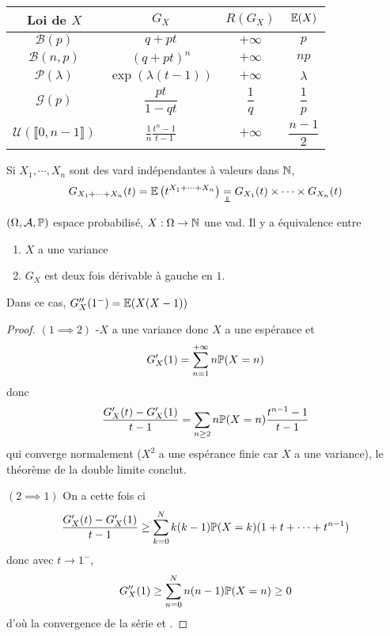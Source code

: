 \begin{ex}~
    \begin{center}
        \begin{tabular}{cccc}
            \hline \hline Loi de $X$ & $G_X$ & $R(G_X)$ & $ \E(X)$ \\
            \hline
            \rule{0pt}{2em} $\mathcal  B(p)$ &  $q+pt$ &  $+\infty$ &  $p$ \\
            \rule{0pt}{2em} $\mathcal B(n,p)$ &  $(q+pt)^n$ &  $+\infty$ & $np$ \\
            \rule{0pt}{2em} $\mathcal  P(\lambda)$ & $\exp (\lambda(t-1))$ & $+\infty$ & $\lambda$ \\
            \rule{0pt}{2em} $\mathcal  G(p)$ & $\dfrac{pt}{1-qt}$ &  $\dfrac{1}{q}$ & $\dfrac{1}{p}$ \\
            \rule{0pt}{2em} $\mathcal U(\llbracket 0,n-1 \rrbracket )$ & $\displaystyle \frac{1}{n} \frac{t^n-1}{t-1}$ & $+\infty$ &  $\dfrac{n-1}2$ \\[1em]
            \hline
        \end{tabular}
    \end{center}
\end{ex}

\begin{rem}
Si $ X_1,\cdots ,X_n$ sont des vard indépendantes à valeurs dans $ \N$, \[
    G_{X_1+\cdots +X_n}(t)=\E\left(t^{X_1+\cdots +X_n}\right)\underset\indep=G_{X_1}(t)\times \cdots \times G_{X_n}(t)
\] 
\end{rem}

\begin{thm}
    \Hyp $(\Omega,\mathcal A,\P)$ espace probabilisé, $X:\Omega\to \N$ une vad.
    \Conc Il y a équivalence entre \begin{enumerate}
        \item $X$ a une variance
        \item  $G_X$ est deux fois dérivable à gauche en  $1$.
    \end{enumerate}
    Dans ce cas, $G_X''(1^-)=\E(X(X-1))$
\end{thm}

\begin{proof}
    $(1\implies 2)$ \hyp $X$ a une variance donc  $X$ a une espérance et  \[
        G'_X(1)= \sum_{n=1}^{+\infty} n\P(X=n)
    \] 
    donc \[
        \frac{G_X'(t)-G_X'(1)}{t-1}=\sum_{n\geq 2}n\P(X=n) \frac{t^{n-1}-1}{t-1}
    \] 
    qui converge normalement ($X^2$ a une espérance finie  car $X$ a une variance), le théorème de la double limite conclut.

    $(2\implies 1)$ On a cette fois ci \[
        \frac{G_X'(t)-G_X'(1)}{t-1}\geq \sum_{k=0}^{N} k(k-1)\P(X=k)(1+t+\cdots +t^{n-1})
    \]
    donc avec $t\to 1^-$, \[
        G''_X(1)\geq  \sum_{n=0}^{N} n(n-1)\P(X=n)\geq 0
    \] 
    d'où la convergence de la série et \conc.
\end{proof}

